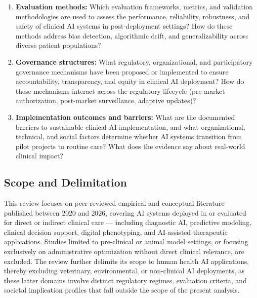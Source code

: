 \begin{enumerate}[label=(\Roman*), itemsep=0.3em]
\item \textbf{Evaluation methods:} Which evaluation frameworks, metrics, and validation methodologies are used to assess the performance, reliability, robustness, and safety of clinical AI systems in post-deployment settings? How do these methods address bias detection, algorithmic drift, and generalizability across diverse patient populations?

\item \textbf{Governance structures:} What regulatory, organizational, and participatory governance mechanisms have been proposed or implemented to ensure accountability, transparency, and equity in clinical AI deployment? How do these mechanisms interact across the regulatory lifecycle (pre-market authorization, post-market surveillance, adaptive updates)?

\item \textbf{Implementation outcomes and barriers:} What are the documented barriers to sustainable clinical AI implementation, and what organizational, technical, and social factors determine whether AI systems transition from pilot projects to routine care? What does the evidence say about real-world clinical impact?
\end{enumerate}


\subsection{Scope and Delimitation}
\label{sec:scope}

This review focuses on peer-reviewed empirical and conceptual literature published between 2020 and 2026, covering AI systems deployed in or evaluated for direct or indirect clinical care --- including diagnostic AI, predictive modeling, clinical decision support, digital phenotyping, and AI-assisted therapeutic applications. Studies limited to pre-clinical or animal model settings, or focusing exclusively on administrative optimization without direct clinical relevance, are excluded. The review further delimits its scope to human health AI applications, thereby excluding veterinary, environmental, or non-clinical AI deployments, as these latter domains involve distinct regulatory regimes, evaluation criteria, and societal implication profiles that fall outside the scope of the present analysis.

